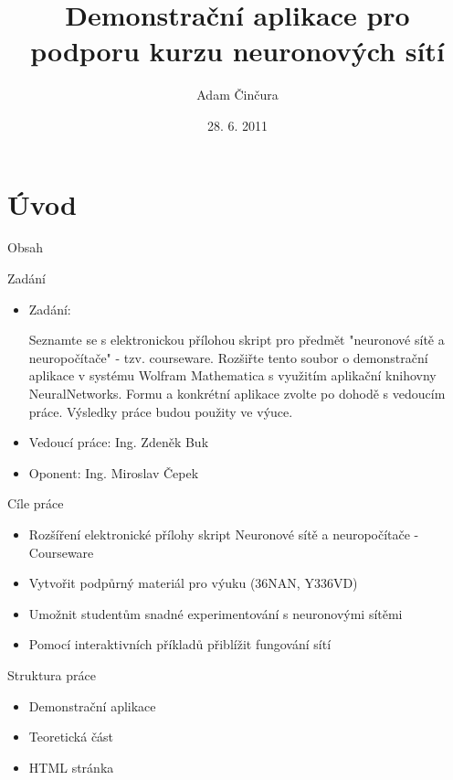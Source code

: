 \documentclass{beamer}
\title[Demonstrační aplikace pro podporu kurzu neuronových sítí]{Demonstrační aplikace pro podporu kurzu neuronových sítí}
\author{Adam Činčura}
\institute{ČVUT - FEL}
\date{28. 6. 2011}
\begin{document}
\begin{frame}
\titlepage
\end{frame}
\section{Úvod}
\begin{frame}{Obsah}
   \tableofcontents
\end{frame}
\begin{frame}{Zadání}

\begin{itemize}
\item Zadání:

Seznamte se s elektronickou přílohou skript pro předmět "neuronové sítě a neuropočítače" - tzv. courseware. Rozšiřte tento soubor o demonstrační aplikace v systému Wolfram Mathematica s využitím aplikační knihovny NeuralNetworks. Formu a konkrétní aplikace zvolte po dohodě s vedoucím práce. Výsledky práce budou použity ve výuce.


\item Vedoucí práce: Ing. Zdeněk Buk
\item Oponent: Ing. Miroslav Čepek
\end{itemize}
\end{frame}

\begin{frame}{Cíle práce}
\begin{itemize}
\item Rozšíření elektronické přílohy skript Neuronové sítě a neuropočítače - Courseware
\item Vytvořit podpůrný materiál pro výuku (36NAN, Y336VD)
\item Umožnit studentům snadné experimentování s neuronovými sítěmi
\item Pomocí interaktivních příkladů přiblížit fungování sítí
\end{itemize}

\end{frame}

\begin{frame}{Struktura práce}
\begin{itemize}
\item Demonstrační aplikace
\item Teoretická část
\item HTML stránka
\end{itemize}
\end{frame}
\end{document}

